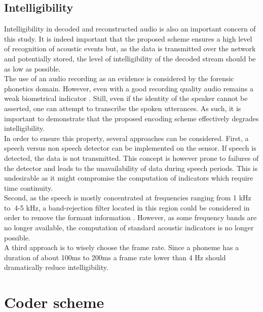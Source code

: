 \documentclass[12pt,times,onecolumn]{article}
\begin{document}
\subsection{Intelligibility}
\label{sec:unintelligibility}
Intelligibility in decoded and reconstructed audio is also an important concern of this study. It is indeed important that the proposed scheme ensures a high level of recognition of acoustic events but, as the data is transmitted over the network and potentially stored, the level of intelligibility of the decoded stream should be as low as possible.\\

The use of an audio recording as an evidence is considered by the forensic phonetics \cite{baldwin1990forensic} domain. However, even with a good recording quality audio remains a weak biometrical indicator \cite{boe2000forensic}. Still, even if the identity of the speaker cannot be asserted, one can attempt to transcribe the spoken utterances. As such, it is important to demonstrate that the proposed encoding scheme effectively degrades intelligibility.\\

In order to ensure this property, several approaches can be considered. First, a speech versus non speech detector can be implemented on the sensor. If speech is detected, the data is not transmitted. This concept is however prone to failures of the detector and leads to the unavailability of data during speech periods. This is undesirable as it might compromise the computation of indicators which require time continuity.\\

Second, as the speech is mostly concentrated at frequencies ranging from 1 kHz to $~$4-5 kHz, a band-rejection filter located in this region could be considered in order to remove the formant information \cite{kent1992acoustic}. However, as some frequency bands are no longer available, the computation of standard acoustic indicators is no longer possible.\\

A third approach is to wisely choose the frame rate. Since a phoneme has a duration of about 100ms to 200ms \cite{kuwabara1996acoustic} \cite{rosen1992temporal} a frame rate lower than 4 Hz should dramatically reduce intelligibility.


\section{Coder scheme}
\end{document}
